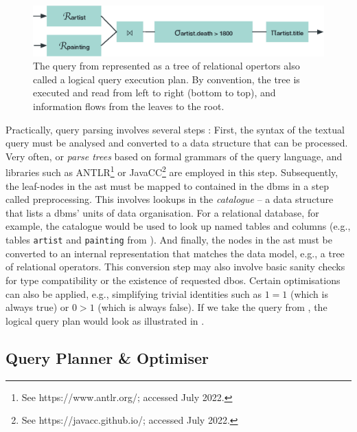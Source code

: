 \begin{figure}[tb]
    \centering
    \includegraphics[width=\textwidth]{figures/query-tree.eps}
    \caption{The query from  represented as a tree of relational opertors also called a logical query execution plan. By convention, the tree is executed and read from left to right (bottom to top), and information flows from the leaves to the root.}
    \label{figure:query-tree}
\end{figure}

Practically, query parsing involves several steps \cite{Graefe:1993Query,Garcia:2009Database}: First, the syntax of the textual query must be analysed and converted to a data structure that can be processed. Very often,  or \emph{parse trees} based on formal grammars of the query language, and libraries such as ANTLR\footnote{See https://www.antlr.org/; accessed July 2022.} or JavaCC\footnote{See https://javacc.github.io/; accessed July 2022.} are employed in this step. Subsequently, the leaf-nodes in the \acrshort{ast} must be mapped to  contained in the \acrshort{dbms} in a step called preprocessing. This involves lookups in the \emph{catalogue} -- a data structure that lists a \acrshort{dbms}' units of data organisation. For a relational database, for example, the catalogue would be used to look up named tables and columns (e.g., tables \texttt{artist} and \texttt{painting} from ). And finally, the nodes in the \acrshort{ast} must be converted to an internal representation that matches the data model, e.g., a tree of relational operators. This conversion step may also involve basic sanity checks for type compatibility or the existence of requested \acrshort{dbo}s. Certain optimisations can also be applied, e.g., simplifying trivial identities such as $1 = 1$ (which is always true) or $0 > 1$ (which is always false). If we take the query from , the logical query plan would look as illustrated in .

\subsection{Query Planner \& Optimiser}

